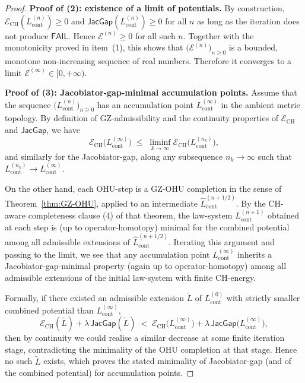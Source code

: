 \documentclass[11pt]{book}
\theoremstyle{plain}
\theoremstyle{definition}
\begin{document}
\begin{proof}
\medskip\noindent
\textbf{Proof of (2): existence of a limit of potentials.}
By construction,
\(\mathcal{E}_{\mathrm{CH}}(L_{\mathrm{cont}}^{(n)})\ge 0\) and
\(\mathsf{JacGap}(L_{\mathrm{cont}}^{(n)})\ge 0\) for all \(n\) as
long as the iteration does not produce \(\mathsf{FAIL}\).  Hence
\(\mathcal{E}^{(n)}\ge 0\) for all such \(n\).  Together with the
monotonicity proved in item~(1), this shows that
\(\bigl(\mathcal{E}^{(n)}\bigr)_{n\ge 0}\) is a bounded, monotone
non-increasing sequence of real numbers.  Therefore it converges to a
limit \(\mathcal{E}^{(\infty)}\in[0,+\infty)\).



\medskip\noindent
\textbf{Proof of (3): Jacobiator-gap-minimal accumulation points.}
Assume that the sequence
\(\bigl(L_{\mathrm{cont}}^{(n)}\bigr)_{n\ge 0}\) has an accumulation
point \(L_{\mathrm{cont}}^{(\infty)}\) in the ambient metric topology.
By definition of GZ-admissibility and the continuity properties of
\(\mathcal{E}_{\mathrm{CH}}\) and \(\mathsf{JacGap}\), we have
\[
  \mathcal{E}_{\mathrm{CH}}\bigl(
    L_{\mathrm{cont}}^{(\infty)}
  \bigr)
  \;\le\;
  \liminf_{k\to\infty}
  \mathcal{E}_{\mathrm{CH}}\bigl(
    L_{\mathrm{cont}}^{(n_k)}
  \bigr),
\]
and similarly for the Jacobiator-gap, along any subsequence
\(n_k\to\infty\) such that
\(L_{\mathrm{cont}}^{(n_k)}\to L_{\mathrm{cont}}^{(\infty)}\).

On the other hand, each OHU-step is a GZ-OHU completion in the sense
of Theorem~\ref{thm:GZ-OHU}, applied to an intermediate
\(\widehat{L}_{\mathrm{cont}}^{(n+1/2)}\).  By the CH-aware
completeness clause \textnormal{(4)} of that theorem, the law-system
\(L_{\mathrm{cont}}^{(n+1)}\) obtained at each step is (up to
operator-homotopy) minimal for the combined potential among all
admissible extensions of \(\widehat{L}_{\mathrm{cont}}^{(n+1/2)}\).
Iterating this argument and passing to the limit, we see that any
accumulation point \(L_{\mathrm{cont}}^{(\infty)}\) inherits a
Jacobiator-gap-minimal property (again up to operator-homotopy) among
all admissible extensions of the initial law-system with finite
CH-energy.

Formally, if there existed an admissible extension
 \(\widetilde{L}\) of \(L_{\mathrm{cont}}^{(0)}\) with strictly smaller
combined potential than \(L_{\mathrm{cont}}^{(\infty)}\),
\[
  \mathcal{E}_{\mathrm{CH}}(\widetilde{L})
  +
  \lambda\,\mathsf{JacGap}(\widetilde{L})
  \;<\;
  \mathcal{E}_{\mathrm{CH}}\bigl(
    L_{\mathrm{cont}}^{(\infty)}
  \bigr)
  +
  \lambda\,\mathsf{JacGap}\bigl(
    L_{\mathrm{cont}}^{(\infty)}
  \bigr),
\]
then by continuity we could realise a similar decrease at some finite
iteration stage, contradicting the minimality of the OHU completion at
that stage.  Hence no such \(\widetilde{L}\) exists, which proves the
stated minimality of Jacobiator-gap (and of the combined potential)
for accumulation points.




\end{proof}
\end{document}
